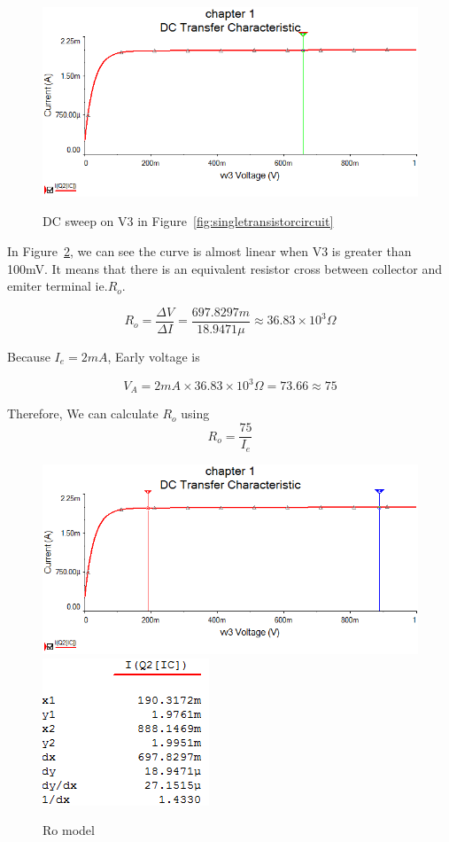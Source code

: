 \begin{figure}[htbp]
	\centering
	\includegraphics[scale=0.7]{"../Photo/Chap1/DC sweep on Batterty"}\\[0.5cm]
	\caption{DC sweep on V3 in Figure~\ref{fig:singletransistorcircuit} }
	\label{fig: DC sweep curve}
\end{figure}

In Figure~\ref{fig: Ro model}, we can see the curve is almost linear when V3 is greater than 100mV. It means that there is an equivalent resistor cross between collector and emiter terminal ie.$R_o$.

\[ R_o= \frac{\Delta V}{\Delta I}= \frac{697.8297m}{18.9471\mu} \approx 36.83\times10^3  \Omega \] 

Because $I_e = 2mA $, Early voltage is

\[ V_A = 2mA \times 36.83\times10^3 \Omega=  73.66 \approx 75 \]

Therefore, We can calculate $R_o$ using 
\begin{equation}
	R_o = \frac{75}{I_e} 
\end{equation}


\begin{figure}[htbp]
	\centering
	\includegraphics[scale=0.7]{"../Photo/Chap1/Ro model"}\\[0.5cm]
	\includegraphics[scale=1]{"../Photo/Chap1/Ro model data"}
	\caption{Ro model }
	\label{fig: Ro model}
\end{figure}




